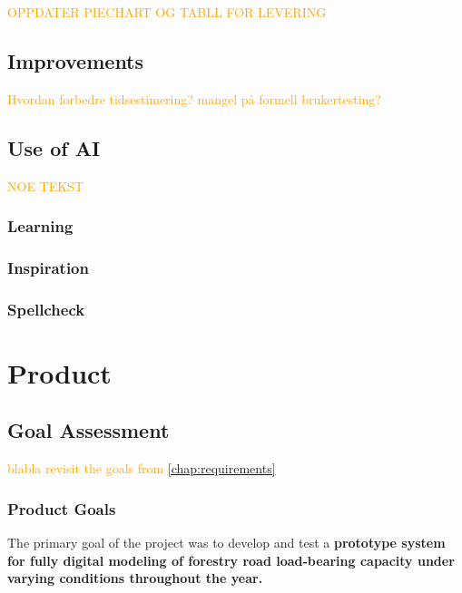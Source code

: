 \textcolor{orange}{OPPDATER PIECHART OG TABLL FØR LEVERING}


\subsection{Improvements}

\textcolor{orange}{Hvordan forbedre tidsestimering? mangel på formell brukertesting? }

\subsection{Use of AI}

\textcolor{orange}{NOE TEKST}

\subsubsection{Learning}

\subsubsection{Inspiration}

\subsubsection{Spellcheck}



\section{Product}

\subsection{Goal Assessment}

\textcolor{orange}{blabla revisit the goals from \autoref{chap:requirements}}

\subsubsection{Product Goals}

The primary goal of the project was to develop and test a \textbf{prototype system for fully digital modeling of forestry road load-bearing capacity under varying conditions throughout the year.} 

